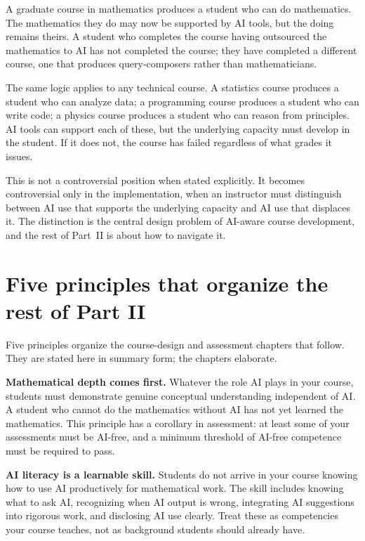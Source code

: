 \documentclass[11pt]{book}
\begin{document}
A graduate course in mathematics produces a student who can do mathematics. The mathematics they do may now be supported by AI tools, but the doing remains theirs. A student who completes the course having outsourced the mathematics to AI has not completed the course; they have completed a different course, one that produces query-composers rather than mathematicians.

The same logic applies to any technical course. A statistics course produces a student who can analyze data; a programming course produces a student who can write code; a physics course produces a student who can reason from principles. AI tools can support each of these, but the underlying capacity must develop in the student. If it does not, the course has failed regardless of what grades it issues.

This is not a controversial position when stated explicitly. It becomes controversial only in the implementation, when an instructor must distinguish between AI use that supports the underlying capacity and AI use that displaces it. The distinction is the central design problem of AI-aware course development, and the rest of Part~II is about how to navigate it.

\section{Five principles that organize the rest of Part II}

Five principles organize the course-design and assessment chapters that follow. They are stated here in summary form; the chapters elaborate.

\textbf{Mathematical depth comes first.} Whatever the role AI plays in your course, students must demonstrate genuine conceptual understanding independent of AI. A student who cannot do the mathematics without AI has not yet learned the mathematics. This principle has a corollary in assessment: at least some of your assessments must be AI-free, and a minimum threshold of AI-free competence must be required to pass.

\textbf{AI literacy is a learnable skill.} Students do not arrive in your course knowing how to use AI productively for mathematical work. The skill includes knowing what to ask AI, recognizing when AI output is wrong, integrating AI suggestions into rigorous work, and disclosing AI use clearly. Treat these as competencies your course teaches, not as background students should already have.
\end{document}
